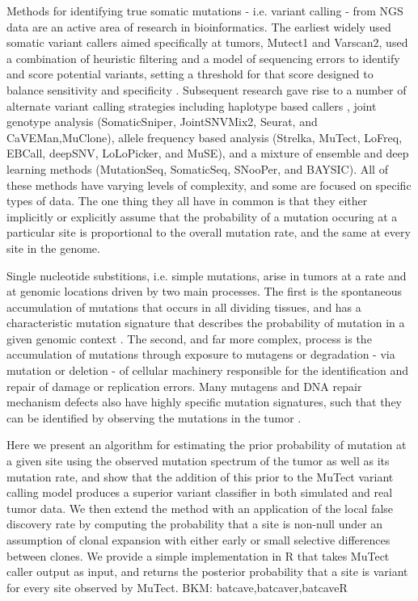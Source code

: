 \documentclass[a4,center,fleqn]{NAR}
\newcommand{\bkmcomment}[1]{{\color{blue}BKM: #1}}
\begin{document}
Methods for identifying true somatic mutations - i.e. variant calling -  from NGS data are an active area of research in bioinformatics.
The earliest widely used somatic variant callers aimed specifically at tumors, Mutect1 and Varscan2, used a combination of heuristic filtering and a model of sequencing errors to identify and score potential variants, setting a threshold for that score designed to balance sensitivity and specificity \citep{Koboldt2012,Cibulskis2013}.
Subsequent research gave rise to a number of alternate variant calling strategies including haplotype based callers \citep{Garrison2012},
joint genotype analysis (SomaticSniper, JointSNVMix2, Seurat, and CaVEMan,MuClone)\citep{Larson2012,Roth2012a,Christoforides2013,Jones2016,Dorri2019}, allele frequency based analysis (Strelka, MuTect, LoFreq, EBCall, deepSNV, LoLoPicker, and MuSE)\citep{Saunders2012,Wilm2012,Shiraishi2013b,Gerstung2012,Carrot-Zhang2017,Fan2016}, and a mixture of ensemble and deep learning methods (MutationSeq, SomaticSeq, SNooPer, and BAYSIC).
All of these methods have varying levels of complexity, and some are focused on specific types of data.
The one thing they all have in common is that they either implicitly or explicitly assume that the probability of a mutation occuring at a particular site is proportional to the overall mutation rate, and the same at every site in the genome.

Single nucleotide substitions, i.e. simple mutations, arise in tumors at a rate and at genomic locations driven by two main processes. 
The first is the spontaneous accumulation of mutations that occurs in all dividing tissues, and has a characteristic mutation signature that describes the probability of mutation in a given genomic context \citep{Nik-Zainal2012a,Alexandrov2015,Lee-Six2018}. 
The second, and far more complex, process is the accumulation of mutations through exposure to mutagens or degradation - via mutation or deletion - of cellular machinery responsible for the identification and repair of damage or replication errors. 
Many mutagens and DNA repair mechanism defects also have highly specific mutation signatures, such that they can be identified by observing the mutations in the tumor \citep{Alexandrov2013a,Helleday2014a,Nik-Zainal2016,Kandoth2013,Alexandrov2016}.

Here we present an algorithm for estimating the prior probability of mutation at a given site using the observed mutation spectrum of the tumor as well as its mutation rate, and show that the addition of this prior to the MuTect variant calling model produces a superior variant classifier in both simulated and real tumor data.
We then extend the method with an application of the local false discovery rate by computing the probability that a site is non-null under an assumption of clonal expansion with either early or small selective differences between clones.
We provide a simple implementation in R that takes MuTect caller output as input, and returns the posterior probability that a site is variant for every site observed by MuTect. \bkmcomment{batcave,batcaver,batcaveR}
\end{document}
